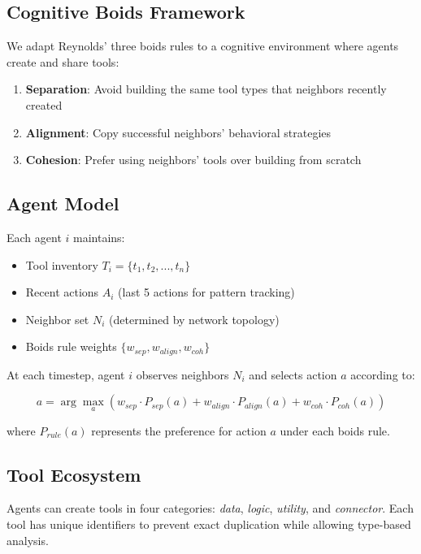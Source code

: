 \documentclass[10pt,twocolumn]{article}
\begin{document}
\subsection{Cognitive Boids Framework}

We adapt Reynolds' three boids rules to a cognitive environment where agents create and share tools:

\begin{enumerate}
\item \textbf{Separation}: Avoid building the same tool types that neighbors recently created
\item \textbf{Alignment}: Copy successful neighbors' behavioral strategies  
\item \textbf{Cohesion}: Prefer using neighbors' tools over building from scratch
\end{enumerate}

\subsection{Agent Model}

Each agent $i$ maintains:
\begin{itemize}
\item Tool inventory $T_i = \{t_1, t_2, ..., t_n\}$
\item Recent actions $A_i$ (last 5 actions for pattern tracking)
\item Neighbor set $N_i$ (determined by network topology)
\item Boids rule weights $\{w_{sep}, w_{align}, w_{coh}\}$
\end{itemize}

At each timestep, agent $i$ observes neighbors $N_i$ and selects action $a$ according to:

$$a = \arg\max_a \left( w_{sep} \cdot P_{sep}(a) + w_{align} \cdot P_{align}(a) + w_{coh} \cdot P_{coh}(a) \right)$$

where $P_{rule}(a)$ represents the preference for action $a$ under each boids rule.

\subsection{Tool Ecosystem}

Agents can create tools in four categories: \textit{data}, \textit{logic}, \textit{utility}, and \textit{connector}. Each tool has unique identifiers to prevent exact duplication while allowing type-based analysis.
\end{document}
